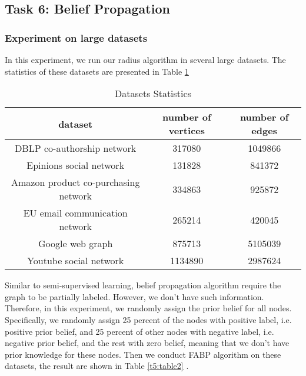 \subsection{Task 6: Belief Propagation}

\subsubsection{Experiment on large datasets}
In this experiment, we run our radius algorithm in several large datasets. The statistics of these datasets are presented in Table \ref{t5:table1}

\begin{table}[!htbf]
\caption{Datasets Statistics}
\begin{center}
\begin{tabular}{|c|c|c|}
\hline \hline
dataset & number of vertices & number of edges \\
\hline
DBLP co-authorship network & 317080  & 1049866  \\
Epinions social network & 131828  & 841372  \\
Amazon product co-purchasing network & 334863 & 925872 \\
EU email communication network & 265214 & 420045 \\
Google web graph & 875713 & 5105039 \\
Youtube social network & 1134890 & 2987624 \\
\hline
\end{tabular}
\end{center}
\label{t5:table1}
\end{table}%

Similar to semi-supervised learning, belief propagation algorithm require the graph to be partially labeled.  However, we don't have such information. Therefore, in this experiment, we randomly assign the prior belief for all nodes. Specifically, we randomly assign 25 percent of the nodes with positive label, i.e. positive prior belief, and 25 percent of other nodes with negative label, i.e. negative prior belief, and the rest with zero belief, meaning that we don't have prior knowledge for these nodes. Then we conduct FABP algorithm on these datasets, the result are shown in Table \ref{t5:table2} .

